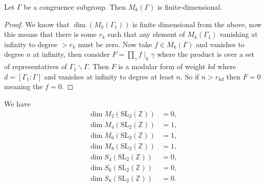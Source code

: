 \begin{theorem}\label{thm:dim-mf}
Let $\Gamma$ be a congruence subgroup. Then $M_k(\Gamma)$ is finite-dimensional.
\end{theorem}
\begin{proof}
We know that $\dim(M_k(\Gamma_1))$ is finite dimensional from the above, now this means that there is some $r_k$ such that any element of $M_k(\Gamma_1)$ vanishing at infinity to degree $> r_k$ must be zero. Now take $f \in M_k(\Gamma)$ and vanishes to degree $n$ at infinity, then consider $F = \prod_\gamma f\mid_k \gamma$ where the product is over a set of representatives of $\Gamma_1 \backslash \Gamma$. Then $F$ is a modular form of weight $k d$ where $d = [\Gamma_1: \Gamma]$ and vanishes at infinity to degree at least $n$. So if $n > r_{kd}$ then $F=0$ meaning the $f=0$.
\end{proof}


\begin{corollary}\label{cor:dim-mf}
We have
\begin{align}
    \dim M_2(\mathrm{SL}_{2}(\mathbb{Z})) &= 0, \label{eqn:dimM2} \\
    \dim M_4(\mathrm{SL}_{2}(\mathbb{Z})) &= 1, \label{eqn:dimM4} \\
    \dim M_6(\mathrm{SL}_{2}(\mathbb{Z})) &= 1, \label{eqn:dimM6} \\
    \dim M_8(\mathrm{SL}_{2}(\mathbb{Z})) &= 1, \label{eqn:dimM8} \\
    \dim S_4(\mathrm{SL}_{2}(\mathbb{Z})) &= 0, \label{eqn:dimS4} \\
    \dim S_6(\mathrm{SL}_{2}(\mathbb{Z})) &= 0, \label{eqn:dimS6} \\
    \dim S_8(\mathrm{SL}_{2}(\mathbb{Z})) &= 0. \label{eqn:dimS8}
\end{align}
\end{corollary}

